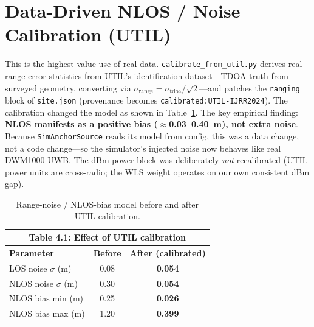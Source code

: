 \documentclass[a4paper,12pt,onecolumn]{report}
\begin{document}
\section{Data-Driven NLOS / Noise Calibration (UTIL)}
This is the highest-value use of real data. \texttt{calibrate\_from\_util.py}
derives real range-error statistics from UTIL's identification dataset---TDOA
truth from surveyed geometry, converting via
$\sigma_{\text{range}} = \sigma_{\text{tdoa}}/\sqrt{2}$---and patches the
\texttt{ranging} block of \texttt{site.json} (provenance becomes
\texttt{calibrated:UTIL-IJRR2024}). The calibration changed the model as shown in
Table~\ref{tab:calib}. The key empirical finding: \textbf{NLOS manifests as a
positive bias ($\approx$0.03--0.40~m), not extra noise}. Because
\texttt{SimAnchorSource} reads its model from config, this was a data change, not
a code change---so the simulator's injected noise now behaves like real DWM1000
UWB. The dBm power block was deliberately \emph{not} recalibrated (UTIL power
units are cross-radio; the WLS weight operates on our own consistent dBm gap).

\begin{table}[H]
\begin{center}
\begin{tabular}{ | l | c | c | }
\hline
\multicolumn{3}{|c|}{\textbf{Table 4.1: Effect of UTIL calibration}}\\
\hline
\textbf{Parameter} & \textbf{Before} & \textbf{After (calibrated)}\\ \hline
LOS noise $\sigma$ (m)      & 0.08 & \textbf{0.054} \\ \hline
NLOS noise $\sigma$ (m)     & 0.30 & \textbf{0.054} \\ \hline
NLOS bias min (m)           & 0.25 & \textbf{0.026} \\ \hline
NLOS bias max (m)           & 1.20 & \textbf{0.399} \\
\hline
\end{tabular}
\caption{Range-noise / NLOS-bias model before and after UTIL calibration.}
\label{tab:calib}
\end{center}
\end{table}
\end{document}
